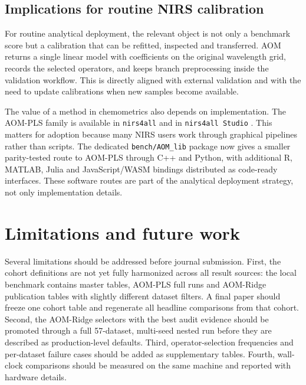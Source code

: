 \documentclass[11pt,a4paper]{article}
\begin{document}
\subsection{Implications for routine NIRS calibration}

For routine analytical deployment, the relevant object is not only a benchmark
score but a calibration that can be refitted, inspected and transferred.  AOM
returns a single linear model with coefficients on the original wavelength
grid, records the selected operators, and keeps branch preprocessing inside
the validation workflow.  This is directly aligned with external validation
and with the need to update calibrations when new samples become available.

The value of a method in chemometrics also depends on implementation.  The
AOM-PLS family is available in \texttt{nirs4all} and in \texttt{nirs4all
Studio} \citep{beurier2026nirs4all,beurier2026nirs4allstudio}.  This matters
for adoption because many NIRS users work through graphical pipelines rather
than scripts.  The dedicated \texttt{bench/AOM\_lib} package now gives a
smaller parity-tested route to AOM-PLS through C++ and Python, with additional
R, MATLAB, Julia and JavaScript/WASM bindings distributed as code-ready
interfaces.  These software routes are part of the analytical deployment
strategy, not only implementation details.

\section{Limitations and future work}

Several limitations should be addressed before journal submission.  First, the
cohort definitions are not yet fully harmonized across all result sources: the
local benchmark contains master tables, AOM-PLS full runs and AOM-Ridge
publication tables with slightly different dataset filters.  A final paper
should freeze one cohort table and regenerate all headline comparisons from
that cohort.  Second, the AOM-Ridge selectors with the best audit evidence
should be promoted through a full 57-dataset, multi-seed nested run before they
are described as production-level defaults.  Third, operator-selection
frequencies and per-dataset failure cases should be added as supplementary
tables.  Fourth, wall-clock comparisons should be measured on the same machine
and reported with hardware details.
\end{document}
